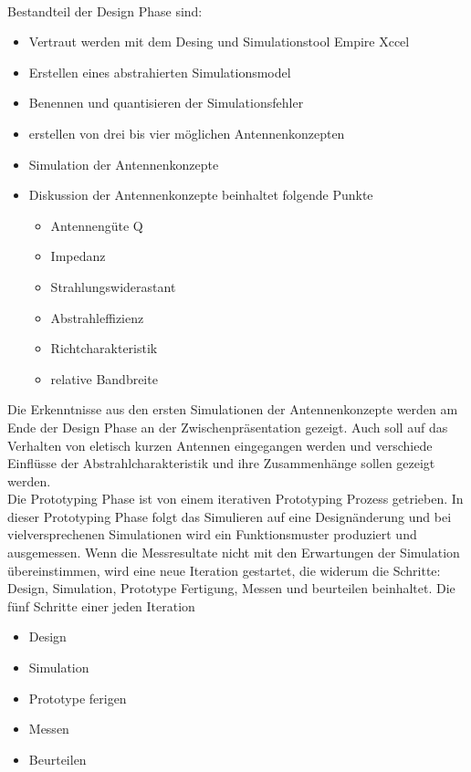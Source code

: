\\Bestandteil der  Design Phase sind:
\begin{itemize}
	 \item Vertraut werden mit dem Desing und Simulationstool Empire  Xccel
	 \item Erstellen eines abstrahierten Simulationsmodel  
	 \item Benennen und quantisieren der Simulationsfehler
	 \item erstellen von drei bis vier möglichen Antennenkonzepten
	 \item Simulation der Antennenkonzepte
	 \item Diskussion der Antennenkonzepte beinhaltet folgende Punkte
		 \begin{itemize}
		 \item Antennengüte Q
		 \item Impedanz
		 \item Strahlungswiderastant
		 \item Abstrahleffizienz
		 \item Richtcharakteristik
		 \item relative Bandbreite
		 \end{itemize}
 \end{itemize} 
Die Erkenntnisse aus den ersten Simulationen der Antennenkonzepte werden am Ende der Design Phase an der Zwischenpräsentation gezeigt. Auch soll auf das Verhalten von eletisch kurzen Antennen eingegangen werden und verschiede Einflüsse der Abstrahlcharakteristik und ihre Zusammenhänge sollen gezeigt werden. \\
Die Prototyping Phase ist von einem iterativen Prototyping Prozess getrieben. In dieser Prototyping Phase folgt das Simulieren auf  eine Designänderung und bei vielversprechenen Simulationen wird ein Funktionsmuster produziert und ausgemessen. Wenn die Messresultate nicht mit den Erwartungen der Simulation übereinstimmen, wird eine neue  Iteration gestartet, die widerum die Schritte: Design, Simulation, Prototype Fertigung, Messen und beurteilen beinhaltet.
   Die fünf Schritte einer jeden Iteration
   \begin{itemize}
	   \item Design
	   \item Simulation
	   \item Prototype ferigen
	   \item Messen
	   \item Beurteilen
   \end{itemize}

